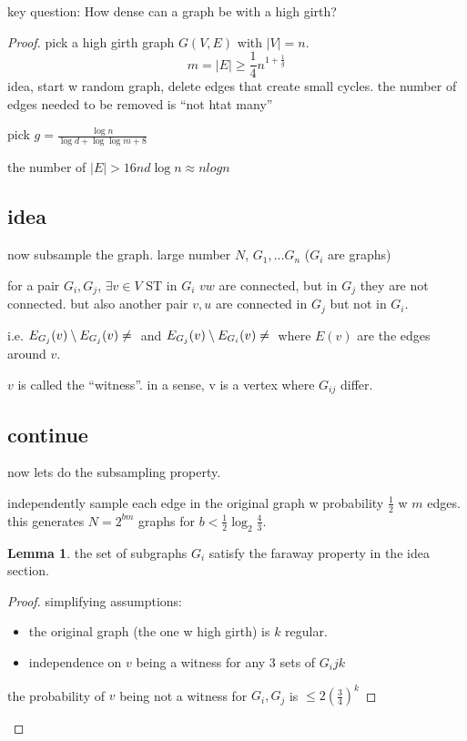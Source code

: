 \documentclass{article}
\theoremstyle{definition}
\newtheorem{lemma}{Lemma}
\begin{document}
key question: How dense can a graph be with a high girth?


\begin{proof}
    pick a high girth graph \(G(V,E)\) with \(\lvert V\rvert = n\).\begin{equation}
        m=\lvert E\rvert \geq \frac{1}{4}n^{1+\frac{1}{g}}
    \end{equation}
    idea, start w random graph, delete edges that create small cycles. the number of edges needed to be removed is ``not htat many''

    pick \(g=\frac{\log n}{\log d + \log\log m + 8}\)

    the number of \(\lvert E\rvert>16nd\log n\approx n log n\)


    \subsection{idea}
    now subsample the graph. large number \(N\), \(G_1,\dots G_n\) (\(G_i\) are graphs)

    for a pair \(G_i,G_j\), \(\exists v\in V\) ST in \(G_i\) \(v w\) are connected, but in \(G_j\) they are not connected. but also another pair \(v,u\) are connected in \(G_j\) but not in \(G_i\). 


    i.e. \(E_{G_j}(v)\setminus E_{G_j}(v)\neq \null\) and \(E_{G_j}(v)\setminus E_{G_i}(v)\neq \null\) where \(E(v)\) are the edges around \(v\). 

    \(v\) is called the ``witness''. in a sense, v is a vertex where \(G_{ij}\) differ.


    \subsection{continue}
    now lets do the subsampling property.

    independently sample each edge in the original graph w probability \(\frac{1}{2}\) w \(m\) edges. this generates \(N = 2^{bm}\) graphs for \(b<\frac{1}{2}\log_2 \frac{4}{3}\). 

    \begin{lemma}
        the set of subgraphs \(G_i\) satisfy the faraway property in the idea section.
    \end{lemma}

    \begin{proof}
        simplifying assumptions: 
        \begin{itemize}
            \item the original graph (the one w high girth) is \(k\) regular.
            \item independence on \(v\) being a witness for any 3 sets of \(G_ijk\)

        \end{itemize}

        the probability of \(v \) being not a witness for \(G_i,G_j\) is \(\leq 2\left( \frac{3}{4} \right)^k \)

    \end{proof}



\end{proof}
\end{document}
